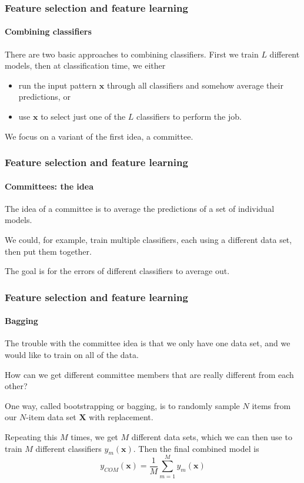 \documentclass[aspectratio=169]{beamer}
\renewcommand{\vec}[1]{\boldsymbol{#1}}
\begin{document}
\begin{frame}
\frametitle{Feature selection and feature learning}
\framesubtitle{Combining classifiers}

There are two basic approaches to combining classifiers.
First we train $L$ different models,
then at classification time, we either
\begin{itemize}
\item run the input pattern $\vec{x}$ through all classifiers and
  somehow \alert{average their predictions}, or
\item use $\vec{x}$ to \alert{select just one} of the $L$ classifiers
  to perform the job.
\end{itemize}

\medskip

We focus on a variant of the first idea, a \alert{committee}.

\end{frame}

\begin{frame}
\frametitle{Feature selection and feature learning}
\framesubtitle{Committees: the idea}

The idea of a committee is to \alert{average the predictions} of a set
of \alert{individual} models.

\medskip

We could, for example, train multiple classifiers, each using a
\alert{different data set}, then put them together.

\medskip

The goal is for the errors of different classifiers to \alert{average
  out}.

\end{frame}

\begin{frame}
\frametitle{Feature selection and feature learning}
\framesubtitle{Bagging}

The trouble with the committee idea is that we only have one data set, and
we would like to train on all of the data.

\medskip

How can we get \alert{different committee members} that are really
different from each other?

\medskip

One way, called \alert{bootstrapping} or \alert{bagging}, is to
randomly sample $N$ items from our $N$-item data set $\vec{X}$ with
replacement.

\medskip

Repeating this $M$ times, we get $M$ different data sets, which we can
then use to train $M$ different classifiers $y_m(\vec{x})$.  Then the
final combined model is
\begin{equation*}
y_{COM}(\vec{x}) = \frac{1}{M} \sum_{m=1}^M y_m(\vec{x})
\end{equation*}

\end{frame}
\end{document}

